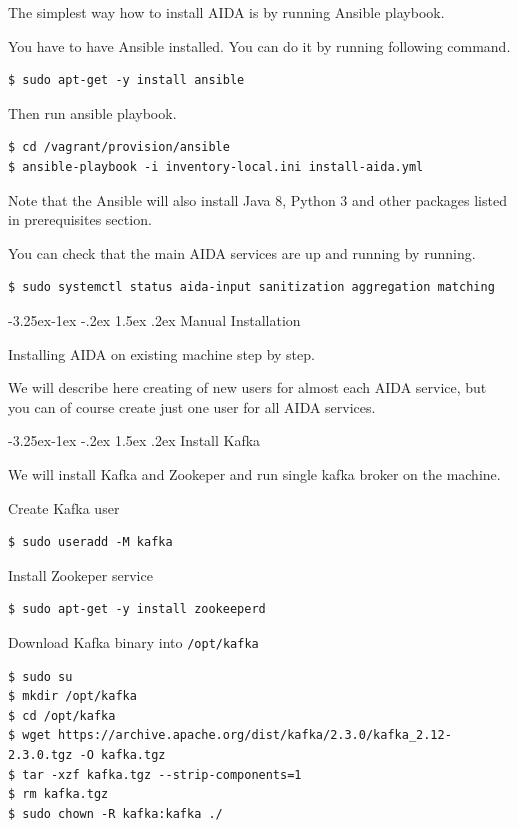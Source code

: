 \documentclass[a4paper]{article} %
\makeatletter
\renewcommand{\normalsize}{\fontsize{12}{15}\selectfont\color{textcolor}}
\renewcommand\subsection{\@startsection{subsection}{2}{\z@}%
                   {-3.25ex\@plus -1ex \@minus -.2ex}%
                   {1.5ex \@plus .2ex}%
                   {\normalfont\sffamily\large\bfseries\color{projectcolor}}}
\renewcommand\subsubsection{\@startsection{subsubsection}{3}{\z@}%
                   {-3.25ex\@plus -1ex \@minus -.2ex}%
                   {1.5ex \@plus .2ex}%
                   {\normalfont\normalsize\sffamily\bfseries\color{projectcolor}}}
\makeatother
\begin{document}
The simplest way how to install AIDA is by running Ansible playbook.

You have to have Ansible installed. You can do it by running following command.

\begin{lstlisting}
$ sudo apt-get -y install ansible
\end{lstlisting}

Then run ansible playbook.

\begin{lstlisting}
$ cd /vagrant/provision/ansible
$ ansible-playbook -i inventory-local.ini install-aida.yml
\end{lstlisting}

Note that the Ansible will also install Java 8, Python 3 and other packages listed in prerequisites section.

You can check that the main AIDA services are up and running by running.
\begin{lstlisting}
$ sudo systemctl status aida-input sanitization aggregation matching
\end{lstlisting}



\subsection{Manual Installation}

Installing AIDA on existing machine step by step.

We will describe here creating of new users for almost each AIDA service, but you can of course create just one user for
all AIDA services.


\subsubsection{Install Kafka}

We will install Kafka and Zookeper and run single kafka broker on the machine.

Create Kafka user
\begin{lstlisting}
$ sudo useradd -M kafka
\end{lstlisting}

Install Zookeper service
\begin{lstlisting}
$ sudo apt-get -y install zookeeperd
\end{lstlisting}

Download Kafka binary into \texttt{/opt/kafka}
\begin{lstlisting}
$ sudo su
$ mkdir /opt/kafka
$ cd /opt/kafka
$ wget https://archive.apache.org/dist/kafka/2.3.0/kafka_2.12-2.3.0.tgz -O kafka.tgz
$ tar -xzf kafka.tgz --strip-components=1
$ rm kafka.tgz
$ sudo chown -R kafka:kafka ./
\end{lstlisting}
\end{document}
